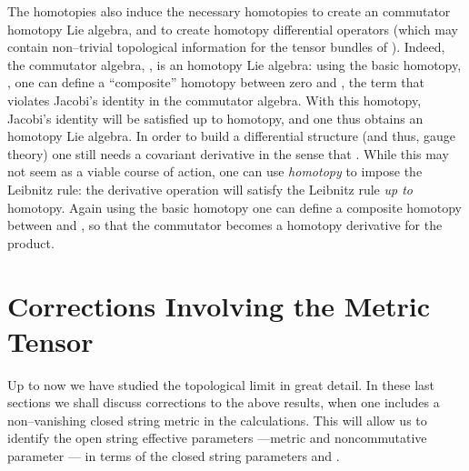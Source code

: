 \documentclass[a4paper,11pt]{article}
\begin{document}
The homotopies \coordHE{} also induce
the necessary homotopies to create an \coordHE{} commutator homotopy Lie
algebra, and to create homotopy differential operators (which may contain 
non--trivial topological information for the tensor bundles of \coordHE{}). 
Indeed, the commutator algebra, \myHighlight{$[x^{i}, x^{j}]_{\bullet}$}\coordHE{}, 
is an \coordHE{} homotopy Lie algebra: using the basic homotopy, \coordHE{}, one can define a ``composite'' homotopy between zero and  
\coordHE{}, the term that violates 
Jacobi's identity in the \myHighlight{$\bullet$}\coordHE{} commutator algebra. With this 
homotopy, Jacobi's identity will be satisfied up to homotopy, and one thus 
obtains an \coordHE{} homotopy Lie algebra. In order to build a differential 
structure (and thus, gauge theory) one still needs a covariant derivative in 
the sense that \coordHE{}. While this may not seem as a viable course of action, one 
can use \textit{homotopy} to impose the Leibnitz rule: the derivative 
operation \coordHE{} will satisfy the Leibnitz rule 
\textit{up to} homotopy. Again using the basic homotopy one can define a 
composite homotopy between \myHighlight{$[ X, F \bullet G ]$}\coordHE{} and \coordHE{}, so that the commutator \myHighlight{$[X,F]$}\coordHE{} becomes a homotopy derivative 
for the \myHighlight{$\bullet$}\coordHE{} product.
 

\section{Corrections Involving the Metric Tensor}


Up to now we have studied the topological limit \coordHE{} in
great detail. In these last sections we shall discuss corrections to the
above results, when one includes a non--vanishing closed string metric
\coordHE{} in the calculations. This will allow us to identify the open
string effective parameters ---metric \coordHE{} and noncommutative parameter
\coordHE{}--- in terms of the closed string parameters \coordHE{} and
\coordHE{}.
\end{document}
